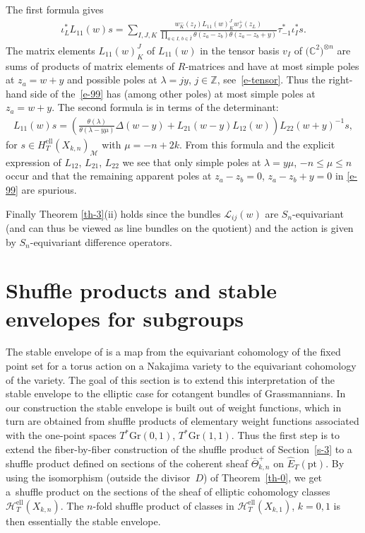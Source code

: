 \documentclass[pdftex]{sigma}
\numberwithin{equation}{section}
\begin{document}
The first formula gives
\begin{gather}\label{e-99}
 \iota_L^*L_{11}(w)s=\sum_{I,J,K} \frac{w^-_K(z_I)L_{11}(w)_K^Jw^+_J(z_L)} {\prod\limits_{a\in I,\,b\in\bar I}\theta(z_a-z_b) \theta(z_a-z_b+y)} \tau_{-1}^*\iota_I^*s.
\end{gather}
The matrix elements $L_{11}(w)_K^J$ of $L_{11}(w)$ in the tensor basis $v_I$ of $\big(\mathbb C^2\big)^{\otimes n}$ are sums of products of matrix elements of $R$-matrices and have at most simple poles at $z_a=w+y$ and possible poles at $\lambda=jy$, $j\in\mathbb Z$, see~\eqref{e-tensor}. Thus the right-hand side of the~\eqref{e-99} has (among other poles) at most simple poles at $z_a=w+y$. The second formula is in terms of the determinant:
\begin{gather*}
 L_{11}(w)s=\left(\frac{\theta(\lambda)} {\theta(\lambda-y\mu)}\Delta(w-y) +L_{21}(w-y)L_{12}(w)\right)L_{22}(w+y)^{-1}s,
\end{gather*}
for $s\in H_T^{\mathrm{ell}}(X_{k,n})_{\mathcal M}$ with $\mu=-n+2k$. From this formula and the explicit expression of $L_{12}$, $L_{21}$, $L_{22}$ we see that only simple poles at $\lambda=y\mu$, $-n\leq \mu\leq n$ occur and that the remaining apparent poles at $z_a-z_b=0$, $z_a-z_b+y=0$ in \eqref{e-99} are spurious.

Finally Theorem \ref{th-3}(ii) holds since the bundles $\mathcal L_{ij}(w)$ are $S_n$-equivariant (and can thus be viewed as line bundles on the quotient) and the action is given by $S_n$-equivariant difference operators.

\section{Shuffle products and stable envelopes for subgroups}\label{s-7}
The stable envelope of \cite{MO} is a map from the equivariant cohomology of the fixed point set for a torus action on a Nakajima variety to the equivariant cohomology of the variety. The goal of this section is to extend this interpretation of the stable envelope to the elliptic case for cotangent bundles of Grassmannians. In our construction the stable envelope is built out of weight functions, which in turn are obtained from shuffle products of elementary weight functions associated with the one-point spaces $T^*\mathrm{Gr}(0,1)$, $T^*\mathrm{Gr}(1,1)$. Thus the first step is to extend the fiber-by-fiber construction of the shuffle product of Section~\ref{s-3} to a shuffle product defined on sections of the coherent sheaf $\bar\Theta^+_{k,n}$ on $\hat E_T(\mathrm{pt})$. By using the isomorphism (outside the divisor~$D$) of Theorem~\ref{th-0}, we get a~shuffle product on the sections of the sheaf of elliptic cohomology classes $\mathcal H^{\mathrm{ell}}_{T}(X_{k,n})$. The $n$-fold shuffle product of classes in $\mathcal H^{\mathrm{ell}}_{T}(X_{k,1})$, $k=0,1$ is then essentially the stable envelope.
\end{document}
